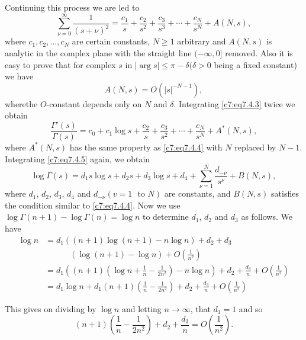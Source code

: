 Continuing this process we are led to 
\begin{equation*}
\sum^{\infty}_{\nu=0}\frac{1}{(s+\nu)^{2}}=\frac{c_{1}}{s}+\frac{c_{2}}{s^{2}}+\frac{c_{3}}{s^{3}}+\cdots+\frac{c_{N}}{s^{N}}+A(N,s),\tag{7.4.3}\label{c7:eq7.4.3} 
\end{equation*}
where $c_{1},c_{2},\ldots,c_{N}$ are certain constants, $N\geq 1$
arbitrary and $A(N,s)$ is analytic in the complex plane with the
straight line $(-\infty,0]$ removed. Also it is easy to prove that for
  complex $s$ in $|\arg s|\leq \pi-\delta(\delta >0$ being a fixed
  constant) we have
\begin{equation*}
A(N,s)=O(|s|^{-N-1}),\tag{7.4.4}\label{c7:eq7.4.4} 
\end{equation*}
where\pageoriginale the $O$-constant depends only on $N$ and
$\delta$. Integrating \eqref{c7:eq7.4.3} twice we obtain
\begin{equation*}
\frac{\Gamma'(s)}{\Gamma(s)}=c_{0}+c_{1}\log
s+\frac{c_{2}}{s}+\frac{c_{3}}{s^{2}}+\cdots+\frac{c_{N}}{s^{N}}+A^{*}(N,s),\tag{7.4.5}\label{c7:eq7.4.5} 
\end{equation*}
where $A^{*}(N,s)$ has the same property as \eqref{c7:eq7.4.4} with
$N$ replaced by $N-1$. Integrating \eqref{c7:eq7.4.5} again, we
obtain
\begin{equation*}
\log \Gamma(s)=d_{1}s\log s+d_{2}s+d_{3}\log
s+d_{4}+\sum^{N}_{\nu=1}\frac{d_{-\nu}}{s^{\nu}}+B(N,s),\tag{7.4.6}\label{c7:eq7.4.6} 
\end{equation*}
where $d_{1}$, $d_{2}$, $d_{3}$, $d_{4}$ and $d_{-\nu}(v=1\text{~ to~
}N)$ are constants, and $B(N,s)$ satisfies the condition similar to
\eqref{c7:eq7.4.4}. Now we use $\log\Gamma(n+1)-\log\Gamma(n)=\log
n$ to determine $d_{1}$, $d_{2}$ and $d_{3}$ as follows. We have
\begin{align*}
\log n &= d_{1}((n+1)\log (n+1)-n\log n)+d_{2}+d_{3}\\
&\qquad\quad (\log (n+1)-\log
n) +O\left(\frac{1}{n^{2}}\right)\\
&= d_{1}((n+1) \left(\log n+\frac{1}{n}-\frac{1}{2n^{2}} \right)-n\log
n)+d_{2}+\frac{d_{3}}{n}+O\left(\frac{1}{n^{2}}\right)\\
&= d_{1}\log n+d_{1}(n+1)\left(\frac{1}{n}-\frac{1}{2n^{2}}\right)+d_{2}+\frac{d_{3}}{n}+O\left(\frac{1}{n^{2}}\right)
\end{align*}

This gives on dividing by $\log n$ and letting $n\to \infty$, that
$d_{1}=1$ and so
$$
(n+1)\left(\frac{1}{n}-\frac{1}{2n^{2}}\right)+d_{2}+\frac{d_{3}}{n}=O\left(\frac{1}{n^{2}}\right).
$$

